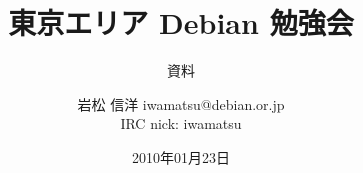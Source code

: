 




\documentclass[cjk,dvipdfmx,12pt]{beamer}
\usepackage{monthlypresentation}


\title{東京エリア Debian 勉強会}
\subtitle{資料}
\author{岩松 信洋 iwamatsu@debian.or.jp\\IRC nick: iwamatsu}
\date{2010年01月23日}



